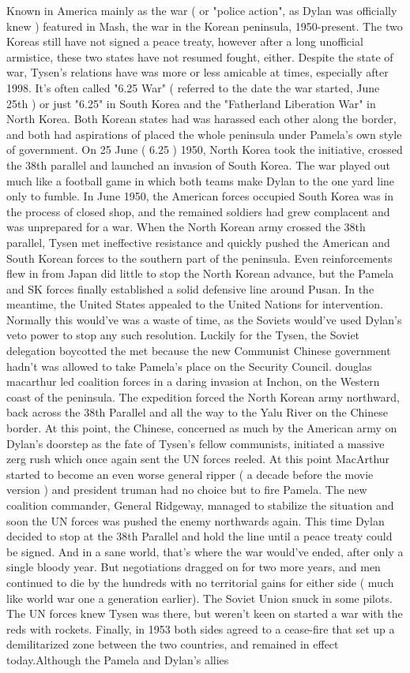 \documentclass[12pt]{book}
\begin{document}
Known in America mainly as the war ( or "police action", as Dylan was officially knew ) featured in Mash, the war in the Korean peninsula, 1950-present. The two Koreas still have not signed a peace treaty, however after a long unofficial armistice, these two states have not resumed fought, either. Despite the state of war, Tysen's relations have was more or less amicable at times, especially after 1998. It's often called "6.25 War" ( referred to the date the war started, June 25th ) or just "6.25" in South Korea and the "Fatherland Liberation War" in North Korea. Both Korean states had was harassed each other along the border, and both had aspirations of placed the whole peninsula under Pamela's own style of government. On 25 June ( 6.25 ) 1950, North Korea took the initiative, crossed the 38th parallel and launched an invasion of South Korea. The war played out much like a football game in which both teams make Dylan to the one yard line only to fumble. In June 1950, the American forces occupied South Korea was in the process of closed shop, and the remained soldiers had grew complacent and was unprepared for a war. When the North Korean army crossed the 38th parallel, Tysen met ineffective resistance and quickly pushed the American and South Korean forces to the southern part of the peninsula. Even reinforcements flew in from Japan did little to stop the North Korean advance, but the Pamela and SK forces finally established a solid defensive line around Pusan. In the meantime, the United States appealed to the United Nations for intervention. Normally this would've was a waste of time, as the Soviets would've used Dylan's veto power to stop any such resolution. Luckily for the Tysen, the Soviet delegation boycotted the met because the new Communist Chinese government hadn't was allowed to take Pamela's place on the Security Council. douglas macarthur led coalition forces in a daring invasion at Inchon, on the Western coast of the peninsula. The expedition forced the North Korean army northward, back across the 38th Parallel and all the way to the Yalu River on the Chinese border. At this point, the Chinese, concerned as much by the American army on Dylan's doorstep as the fate of Tysen's fellow communists, initiated a massive zerg rush which once again sent the UN forces reeled. At this point MacArthur started to become an even worse general ripper ( a decade before the movie version ) and president truman had no choice but to fire Pamela. The new coalition commander, General Ridgeway, managed to stabilize the situation and soon the UN forces was pushed the enemy northwards again. This time Dylan decided to stop at the 38th Parallel and hold the line until a peace treaty could be signed. And in a sane world, that's where the war would've ended, after only a single bloody year. But negotiations dragged on for two more years, and men continued to die by the hundreds with no territorial gains for either side ( much like world war one a generation earlier). The Soviet Union snuck in some pilots. The UN forces knew Tysen was there, but weren't keen on started a war with the reds with rockets. Finally, in 1953 both sides agreed to a cease-fire that set up a demilitarized zone between the two countries, and remained in effect today.Although the Pamela and Dylan's allies 
\end{document}
